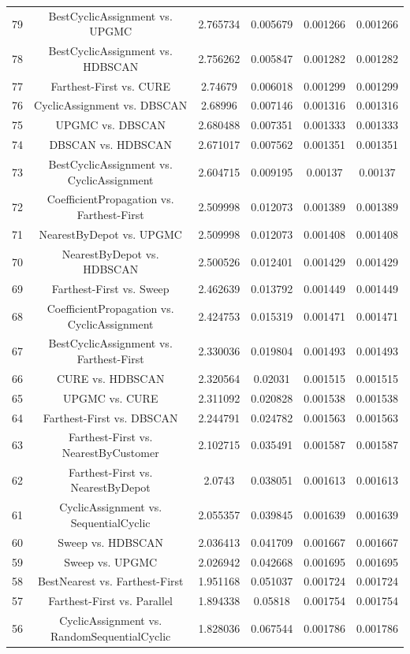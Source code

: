 \documentclass[a4paper,10pt]{article}
\begin{document}
\begin{landscape}
\begin{table}[!htp]
\begin{tabular}{cccccc}
79&BestCyclicAssignment vs. UPGMC&2.765734&0.005679&0.001266&0.001266\\
78&BestCyclicAssignment vs. HDBSCAN&2.756262&0.005847&0.001282&0.001282\\
77&Farthest-First vs. CURE&2.74679&0.006018&0.001299&0.001299\\
76&CyclicAssignment vs. DBSCAN&2.68996&0.007146&0.001316&0.001316\\
75&UPGMC vs. DBSCAN&2.680488&0.007351&0.001333&0.001333\\
74&DBSCAN vs. HDBSCAN&2.671017&0.007562&0.001351&0.001351\\
73&BestCyclicAssignment vs. CyclicAssignment&2.604715&0.009195&0.00137&0.00137\\
72&CoefficientPropagation vs. Farthest-First&2.509998&0.012073&0.001389&0.001389\\
71&NearestByDepot vs. UPGMC&2.509998&0.012073&0.001408&0.001408\\
70&NearestByDepot vs. HDBSCAN&2.500526&0.012401&0.001429&0.001429\\
69&Farthest-First vs. Sweep&2.462639&0.013792&0.001449&0.001449\\
68&CoefficientPropagation vs. CyclicAssignment&2.424753&0.015319&0.001471&0.001471\\
67&BestCyclicAssignment vs. Farthest-First&2.330036&0.019804&0.001493&0.001493\\
66&CURE vs. HDBSCAN&2.320564&0.02031&0.001515&0.001515\\
65&UPGMC vs. CURE&2.311092&0.020828&0.001538&0.001538\\
64&Farthest-First vs. DBSCAN&2.244791&0.024782&0.001563&0.001563\\
63&Farthest-First vs. NearestByCustomer&2.102715&0.035491&0.001587&0.001587\\
62&Farthest-First vs. NearestByDepot&2.0743&0.038051&0.001613&0.001613\\
61&CyclicAssignment vs. SequentialCyclic&2.055357&0.039845&0.001639&0.001639\\
60&Sweep vs. HDBSCAN&2.036413&0.041709&0.001667&0.001667\\
59&Sweep vs. UPGMC&2.026942&0.042668&0.001695&0.001695\\
58&BestNearest vs. Farthest-First&1.951168&0.051037&0.001724&0.001724\\
57&Farthest-First vs. Parallel&1.894338&0.05818&0.001754&0.001754\\
56&CyclicAssignment vs. RandomSequentialCyclic&1.828036&0.067544&0.001786&0.001786\\

\end{tabular}
\end{table}
\end{landscape}
\end{document}
